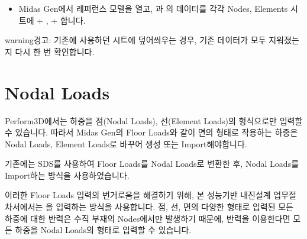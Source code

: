 \documentclass[a4paper,11pt,korean,openany,oneside]{sphinxmanual}
\begin{document}
\begin{sphinxShadowBox}
\begin{itemize}
\item {} 
\sphinxAtStartPar
Midas Gen에서 레퍼런스 모델을 열고, 과 의
데이터를 각각 Nodes, Elements 시트에 + , + 합니다.

\end{itemize}
\end{sphinxShadowBox}

\begin{sphinxadmonition}{warning}{경고:}
\sphinxAtStartPar
기존에 사용하던 시트에 덮어씌우는 경우, 기존 데이터가 모두 지워졌는지 다시 한 번 확인합니다.
\end{sphinxadmonition}

\sphinxstepscope


\section{Nodal Loads}
\label{\detokenize{2_nodal_loads:nodal-loads}}\label{\detokenize{2_nodal_loads::doc}}
\sphinxAtStartPar
Perform\sphinxhyphen{}3D에서는 하중을 점(Nodal Loads), 선(Element Loads)의 형식으로만 입력할 수 있습니다.
따라서 Midas Gen의 Floor Loads와 같이 면의 형태로 작용하는 하중은 Nodal Loads, Element Loads로 바꾸어 생성 또는 Import해야합니다.

\sphinxAtStartPar
{}기존에는 SDS를 사용하여 Floor Loads를 Nodal Loads로 변환한 후, Nodal Loads를 Import하는 방식을 사용하였습니다.

\sphinxAtStartPar
이러한 Floor Loads 입력의 번거로움을 해결하기 위해, 본 성능기반 내진설계 업무절차서에서는 을 입력하는 방식을 사용합니다.
점, 선, 면의 다양한 형태로 입력된 모든 하중에 대한 반력은 수직 부재의 Nodes에서만 발생하기 때문에,
반력을 이용한다면 모든 하중을 Nodal Loads의 형태로 입력할 수 있습니다.
\end{document}
